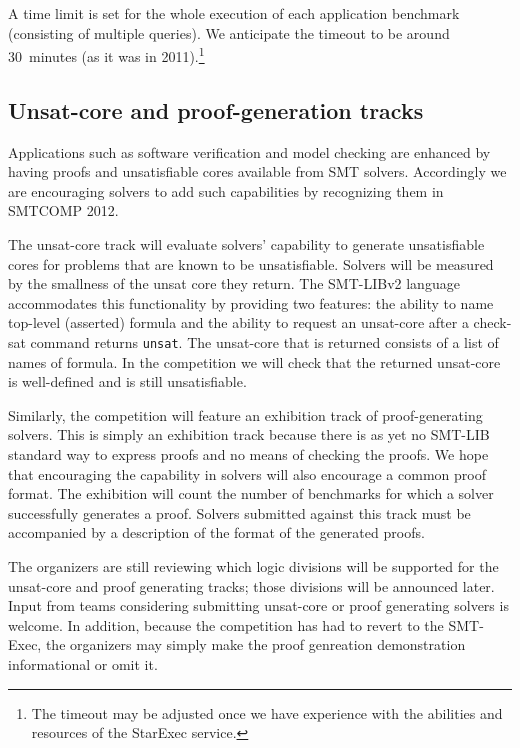 \documentclass[12pt]{article}
\begin{document}
A time limit is set for the whole execution of each application
benchmark (consisting of multiple queries).  We anticipate the
timeout to be around 30~minutes (as it was in 2011).\footnote{The timeout may be adjusted once we have experience with the abilities and resources of the StarExec service.}


\subsection{Unsat-core and proof-generation tracks}

Applications such as software verification and model checking are enhanced by having
proofs and unsatisfiable cores available from SMT solvers. Accordingly we are 
encouraging solvers to add such capabilities by recognizing them in SMTCOMP 2012.

The unsat-core track will evaluate solvers' capability to generate unsatisfiable cores for
problems that are known to be unsatisfiable. Solvers will be measured by the smallness of
the unsat core they return. The SMT-LIBv2 language accommodates this functionality by 
providing two features: the ability to name top-level (asserted) formula and the ability to
request an unsat-core after a check-sat command returns \texttt{unsat}. The unsat-core that
is returned consists of a list of names of formula. In the competition we will check that the
returned unsat-core is well-defined and is still unsatisfiable.

Similarly, the competition will feature an exhibition track of proof-generating solvers. This is
simply an exhibition track because there is as yet no SMT-LIB standard way to express proofs and no
means of checking the proofs. We hope
that encouraging the capability in solvers will also encourage a common proof format. The exhibition
will count the number of benchmarks for which a solver successfully generates a proof.
Solvers submitted against this track must be accompanied by a description of the format of the 
generated proofs. 

The organizers are still reviewing which logic divisions will be supported for the unsat-core and proof generating tracks; 
those divisions will be announced later.
Input from teams considering submitting unsat-core or proof generating solvers is welcome. In addition, because
the competition has had to revert to the SMT-Exec, the organizers may simply make the proof genreation demonstration 
informational or omit it.
\end{document}
